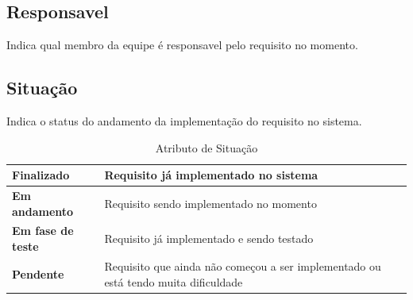 \subsection{Responsavel}

  Indica qual membro da equipe é responsavel pelo requisito no momento.

\subsection{Situação}

  Indica o status do andamento da implementação do requisito no sistema.

  \begin{table}[!htb]
    \centering
    \begin{tabular}{p{5cm}p{10cm}}
      \toprule
      \textbf{Finalizado}       & Requisito já implementado no sistema                                                \\ \midrule
      \textbf{Em andamento}     & Requisito sendo implementado no momento                                             \\ \midrule
      \textbf{Em fase de teste} & Requisito já implementado e sendo testado                                           \\ \midrule
      \textbf{Pendente}         & Requisito que ainda não começou a ser implementado ou está tendo muita dificuldade  \\
      \bottomrule
    \end{tabular}
    \caption{Atributo de Situação}
  \end{table}

